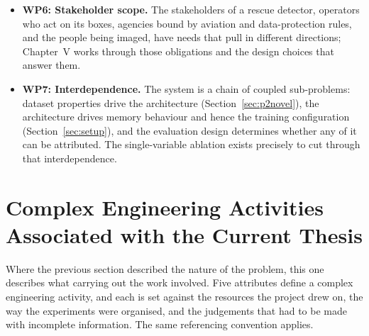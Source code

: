 \documentclass[12pt,a4paper,oneside]{report}
\begin{document}
\begin{itemize}
        (Sections~\ref{sec:metrics} and~\ref{sec:protocol}) had to be designed for the problem.
  \item \textbf{WP6: Stakeholder scope.} The stakeholders of a rescue
        detector, operators who act on its boxes, agencies bound by aviation
        and data-protection rules, and the people being imaged, have needs
        that pull in different directions; Chapter~V works through those
        obligations and the design choices that answer them.
  \item \textbf{WP7: Interdependence.} The system is a chain of coupled
        sub-problems: dataset properties drive the architecture
        (Section~\ref{sec:p2novel}), the architecture drives memory behaviour and hence
        the training configuration (Section~\ref{sec:setup}), and the evaluation design
        determines whether any of it can be attributed. The single-variable
        ablation exists precisely to cut through that interdependence.
\end{itemize}

\section{Complex Engineering Activities Associated with the Current Thesis}

Where the previous section described the nature of the problem, this one
describes what carrying out the work involved. Five attributes define a complex
engineering activity, and each is set against the resources the project drew on,
the way the experiments were organised, and the judgements that had to be made
with incomplete information. The same referencing convention applies.
\end{document}
